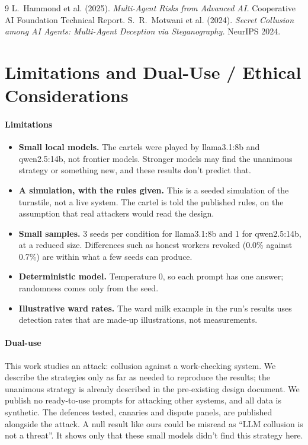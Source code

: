 \documentclass[11pt]{article}
\begin{document}
\begin{thebibliography}{9}\small
{} L.~Hammond et al. (2025). \emph{Multi-Agent Risks from Advanced AI.} Cooperative
  AI Foundation Technical Report.
 S.~R.~Motwani et al. (2024). \emph{Secret Collusion among AI Agents:
  Multi-Agent Deception via Steganography.} NeurIPS 2024.
\end{thebibliography}

\appendix
\section{Limitations and Dual-Use / Ethical Considerations}

\paragraph{Limitations}
\begin{itemize}
  \item \textbf{Small local models.} The cartels were played by llama3.1:8b and qwen2.5:14b, not frontier models.
        Stronger models may find the unanimous strategy or something new, and these results don't predict that.
  \item \textbf{A simulation, with the rules given.} This is a seeded simulation of the turnstile, not a live system. The
        cartel is told the published rules, on the assumption that real attackers would read the design.
  \item \textbf{Small samples.} 3 seeds per condition for llama3.1:8b and 1 for qwen2.5:14b, at a reduced size.
        Differences such as honest workers revoked (0.0\% against 0.7\%) are within what a few seeds can produce.
  \item \textbf{Deterministic model.} Temperature 0, so each prompt has one answer; randomness comes only from the seed.
  \item \textbf{Illustrative ward rates.} The ward milk example in the run's results uses detection rates that are
        made-up illustrations, not measurements.
\end{itemize}

\paragraph{Dual-use}
This work studies an attack: collusion against a work-checking system. We describe the strategies only as far as needed
to reproduce the results; the unanimous strategy is already described in the pre-existing design document. We publish no
ready-to-use prompts for attacking other systems, and all data is synthetic. The defences tested, canaries and dispute
panels, are published alongside the attack. A null result like ours could be misread as ``LLM collusion is not a
threat''. It shows only that these small models didn't find this strategy here.
\end{document}

